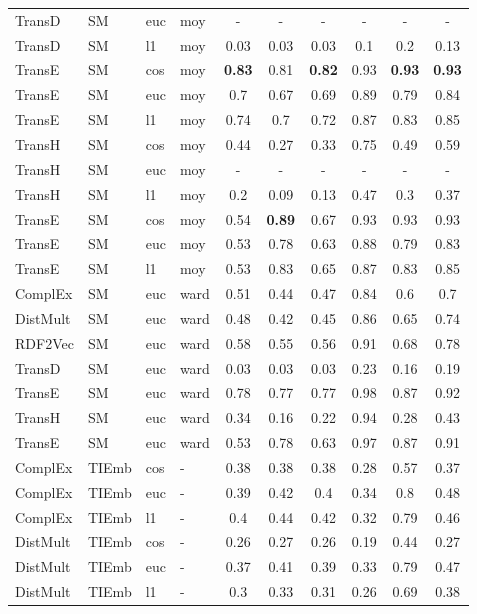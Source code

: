 \begin{longtable}{|llll|ccc|ccc|}
TransD	&	SM	&	euc	&	moy	&	-	&	-	&	-	&	-	&	-	&	-\\
TransD	&	SM	&	l1	&	moy	&	0.03	&	0.03	&	0.03	&	0.1	&	0.2	&	0.13 \\ 
TransE	&	SM	&	cos	&	moy	&	\textbf{0.83}	&	0.81	&	\textbf{0.82}	&	0.93	&	\textbf{0.93}	&	\textbf{0.93} \\ 
TransE	&	SM	&	euc	&	moy	&	0.7	&	0.67	&	0.69	&	0.89	&	0.79	&	0.84 \\ 
TransE	&	SM	&	l1	&	moy	&	0.74	&	0.7	&	0.72	&	0.87	&	0.83	&	0.85 \\ 
TransH	&	SM	&	cos	&	moy	&	0.44	&	0.27	&	0.33	&	0.75	&	0.49	&	0.59 \\ 
TransH	&	SM	&	euc	&	moy	&	-	&	-	&	-	&	-	&	-	&	- \\ 
TransH	&	SM	&	l1	&	moy	&	0.2	&	0.09	&	0.13	&	0.47	&	0.3	&	0.37 \\ 
TransE	&	SM	&	cos	&	moy	&	0.54	&	\textbf{0.89}	&	0.67	&	0.93	&	0.93	&	0.93 \\ 
TransE	&	SM	&	euc	&	moy	&	0.53	&	0.78	&	0.63	&	0.88	&	0.79	&	0.83 \\ 
TransE	&	SM	&	l1	&	moy	&	0.53	&	0.83	&	0.65	&	0.87	&	0.83	&	0.85 \\ 
ComplEx	&	SM	&	euc	&	ward	&	0.51	&	0.44	&	0.47	&	0.84	&	0.6	&	0.7 \\ 
DistMult	&	SM	&	euc	&	ward	&	0.48	&	0.42	&	0.45	&	0.86	&	0.65	&	0.74 \\ 
RDF2Vec	&	SM	&	euc	&	ward	&	0.58	&	0.55	&	0.56	&	0.91	&	0.68	&	0.78 \\ 
TransD	&	SM	&	euc	&	ward	&	0.03	&	0.03	&	0.03	&	0.23	&	0.16	&	0.19 \\ 
TransE	&	SM	&	euc	&	ward	&	0.78	&	0.77	&	0.77	&	0.98	&	0.87	&	0.92 \\ 
TransH	&	SM	&	euc	&	ward	&	0.34	&	0.16	&	0.22	&	0.94	&	0.28	&	0.43 \\ 
TransE	&	SM	&	euc	&	ward	&	0.53	&	0.78	&	0.63	&	0.97	&	0.87	&	0.91 \\ 
\hline 
ComplEx	&	TIEmb	&	cos	&	-	&	0.38	&	0.38	&	0.38	&	0.28	&	0.57	&	0.37 \\ 
ComplEx	&	TIEmb	&	euc	&	-	&	0.39	&	0.42	&	0.4	&	0.34	&	0.8	&	0.48 \\ 
ComplEx	&	TIEmb	&	l1	&	-	&	0.4	&	0.44	&	0.42	&	0.32	&	0.79	&	0.46 \\ 
DistMult	&	TIEmb	&	cos	&	-	&	0.26	&	0.27	&	0.26	&	0.19	&	0.44	&	0.27 \\ 
DistMult	&	TIEmb	&	euc	&	-	&	0.37	&	0.41	&	0.39	&	0.33	&	0.79	&	0.47 \\ 
DistMult	&	TIEmb	&	l1	&	-	&	0.3	&	0.33	&	0.31	&	0.26	&	0.69	&	0.38 \\ 

\end{longtable}
